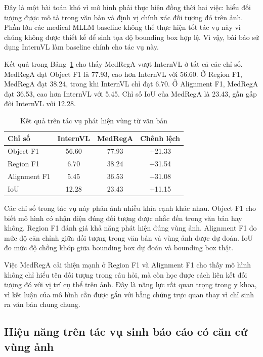 \documentclass[12pt,a4paper,oneside]{extarticle}
\begin{document}
Đây là một bài toán khó vì mô hình phải thực hiện đồng thời hai việc: hiểu đối tượng được mô tả trong văn bản và định vị chính xác đối tượng đó trên ảnh. Phần lớn các medical MLLM baseline không thể thực hiện tốt tác vụ này vì chúng không được thiết kế để sinh tọa độ bounding box hợp lệ. Vì vậy, bài báo sử dụng InternVL làm baseline chính cho tác vụ này.

Kết quả trong Bảng~\ref{tab:text_to_region} cho thấy MedRegA vượt InternVL ở tất cả các chỉ số. MedRegA đạt Object F1 là 77.93, cao hơn InternVL với 56.60. Ở Region F1, MedRegA đạt 38.24, trong khi InternVL chỉ đạt 6.70. Ở Alignment F1, MedRegA đạt 36.53, cao hơn InternVL với 5.45. Chỉ số IoU của MedRegA là 23.43, gần gấp đôi InternVL với 12.28.

\begin{table}[htbp]
\centering
\caption{Kết quả trên tác vụ phát hiện vùng từ văn bản}
\label{tab:text_to_region}
\begin{tabular}{lccc}
\toprule
\textbf{Chỉ số} & \textbf{InternVL} & \textbf{MedRegA} & \textbf{Chênh lệch} \\
\midrule
Object F1 & 56.60 & 77.93 & +21.33 \\
Region F1 & 6.70 & 38.24 & +31.54 \\
Alignment F1 & 5.45 & 36.53 & +31.08 \\
IoU & 12.28 & 23.43 & +11.15 \\
\bottomrule
\end{tabular}
\end{table}

Các chỉ số trong tác vụ này phản ánh nhiều khía cạnh khác nhau. Object F1 cho biết mô hình có nhận diện đúng đối tượng được nhắc đến trong văn bản hay không. Region F1 đánh giá khả năng phát hiện đúng vùng ảnh. Alignment F1 đo mức độ căn chỉnh giữa đối tượng trong văn bản và vùng ảnh được dự đoán. IoU đo mức độ chồng khớp giữa bounding box dự đoán và bounding box thật.

Việc MedRegA cải thiện mạnh ở Region F1 và Alignment F1 cho thấy mô hình không chỉ hiểu tên đối tượng trong câu hỏi, mà còn học được cách liên kết đối tượng đó với vị trí cụ thể trên ảnh. Đây là năng lực rất quan trọng trong y khoa, vì kết luận của mô hình cần được gắn với bằng chứng trực quan thay vì chỉ sinh ra văn bản chung chung.

\subsection{Hiệu năng trên tác vụ sinh báo cáo có căn cứ vùng ảnh}
\end{document}

